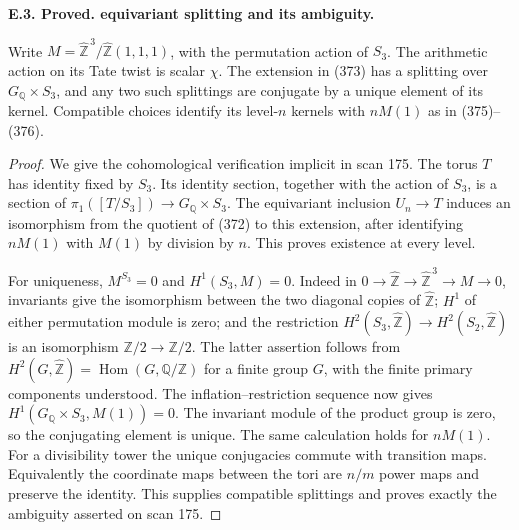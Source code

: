 \documentclass[11pt,oneside]{article}
\makeatletter
\newcounter{statementanchor}
\newenvironment{statement}[3]{%
 \refstepcounter{statementanchor}\def\@currentlabel{#1}%
 \par\addvspace{9pt}\noindent
 \textbf{#1. #2. #3.}\par\nobreak\noindent\ignorespaces
}{\par\addvspace{5pt}}
\makeatother
\begin{document}
\begin{statement}{E.3}{Proved}{equivariant splitting and its ambiguity}
\label{st:E.3}
\label{E-equivariant}
Write $M=\widehat{\mathbb Z}^{\,3}/\widehat{\mathbb Z}(1,1,1)$,
with the permutation action of $S_3$. The arithmetic action
on its Tate twist is scalar $\chi$.
The extension in (373) has a splitting over
$G_{\mathbb Q}\times S_3$, and any two such splittings
are conjugate by a unique element of its kernel.
Compatible choices identify its level-$n$ kernels with $nM(1)$
as in (375)--(376).
\end{statement}
\begin{proof}
We give the cohomological verification implicit in scan 175.
The torus $T$ has identity fixed by $S_3$. Its identity
section, together with the action of $S_3$, is a section
of $\pi_1([T/S_3])\to G_{\mathbb Q}\times S_3$.
The equivariant inclusion $U_n\to T$ induces an isomorphism
from the quotient of (372) to this extension, after
identifying $nM(1)$ with $M(1)$ by division by $n$.
This proves existence at every level.

For uniqueness, $M^{S_3}=0$ and $H^1(S_3,M)=0$.
Indeed in
$0\to\widehat{\mathbb Z}\to\widehat{\mathbb Z}^{\,3}
\to M\to0$, invariants give the isomorphism between
the two diagonal copies of $\widehat{\mathbb Z}$;
$H^1$ of either permutation module is zero; and the
restriction
$H^2(S_3,\widehat{\mathbb Z})\to
 H^2(S_2,\widehat{\mathbb Z})$
is an isomorphism $\mathbb Z/2\to\mathbb Z/2$.
The latter assertion follows from
$H^2(G,\widehat{\mathbb Z})
=\operatorname{Hom}(G,\mathbb Q/\mathbb Z)$
for a finite group $G$, with the finite primary
components understood. The inflation--restriction
sequence now gives
$H^1(G_{\mathbb Q}\times S_3,M(1))=0$.
The invariant module of the product group is zero,
so the conjugating element is unique.
The same calculation holds for $nM(1)$.
For a divisibility tower the unique conjugacies commute
with transition maps. Equivalently the coordinate maps
between the tori are $n/m$ power maps and preserve the
identity. This supplies compatible splittings and
proves exactly the ambiguity asserted on scan 175.
\end{proof}
\end{document}
